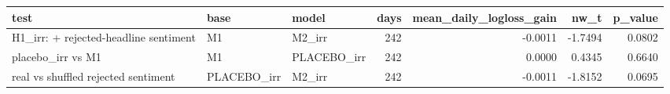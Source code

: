 \begin{tabular}{lllrrrr}
\toprule
test & base & model & days & mean\_daily\_logloss\_gain & nw\_t & p\_value \\
\midrule
H1\_irr: + rejected-headline sentiment & M1 & M2\_irr & 242 & -0.0011 & -1.7494 & 0.0802 \\
placebo\_irr vs M1 & M1 & PLACEBO\_irr & 242 & 0.0000 & 0.4345 & 0.6640 \\
real vs shuffled rejected sentiment & PLACEBO\_irr & M2\_irr & 242 & -0.0011 & -1.8152 & 0.0695 \\
\bottomrule
\end{tabular}
